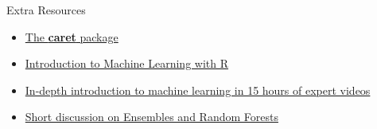 \documentclass[11pt]{beamer}
\begin{document}
\begin{frame}{
	\begin{minipage}[t]{0.55\textwidth}
		Extra Resources
	\end{minipage}
	\hfill
	\begin{minipage}[t]{0.35\textwidth}
		\flushright
	\end{minipage}
}{}
\begin{itemize}
	\item \href{http://topepo.github.io/caret/index.html}{The \textbf{caret} package}
	\item \href{https://lgatto.github.io/IntroMachineLearningWithR/an-introduction-to-machine-learning-with-r.html}{Introduction to Machine Learning with R}
	\item \href{https://www.r-bloggers.com/in-depth-introduction-to-machine-learning-in-15-hours-of-expert-videos/}{In-depth introduction to machine learning in 15 hours of expert videos}
	\item \href{EnsemblesAndRandomForest.pdf}{Short discussion on Ensembles and Random Forests}
\end{itemize}
\end{frame}
\end{document}
